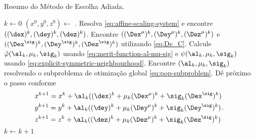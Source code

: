 \begin{algorithm}
\onehalfspacing
\caption{Resumo do Método de Escolha Adiada.}
\label{alg:optimized-choice-of-parameters} \begin{algorithmic}[1]
\State $k \gets 0$
\State $(x^0,y^0,z^0) \gets$ .
	\Repeat
		\State Resolva   \eqref{eq:affine-scaling-system} e encontre
		$((\dex)^{k},(\dey)^{k},(\dez)^{k})$.
		\State 	Encontre $((\Dex^\mu)^{k},(\Dey^\mu)^{k},(\Dez^\mu)^{k})$ e
		$((\Dex^\sig)^{k},(\Dey^\sig)^{k},(\Dez^\sig)^{k})$ utilizando
		\eqref{eq:De_C}.
		\State Calcule  $\hat{\varphi}(\al_{k},\mu_{k},\sig_{k})$ usando
		\eqref{eq:merit-function-al-mu-sig} e $\psi(\al_{k},\mu_{k},\sig_{k})$ usando
		\eqref{eq:explicit-symmetric-neighbourhood}.
		\State Encontre $(\al_{k},\mu_{k},\sig_{k})$ resolvendo o subproblema de
		otimização global 
		\eqref{eq:pop-subproblem}.
		\State Dê próximo o passo conforme
		\[
		\begin{aligned}	
		& x^{k+1} = x^{k} + \al_k((\dex)^{k} + \mu_{k}(\Dex^\mu)^{k} +
		\sig_{k}(\Dex^\sig)^{k} )
		\\
		& y^{k+1} = y^{k} + \al_k((\dey)^{k} + \mu_{k}(\Dey^\mu)^{k} +
		\sig_{k}(\Dey^\sig)^{k} )
		\\
		& z^{k+1} = z^{k} + \al_k((\dez)^{k} + \mu_{k}(\Dez^\mu)^{k} +
		\sig_{k}(\Dez^\sig)^{k} ) \end{aligned}. 
		\]		
		\State $k\gets k+1$
\EndProcedure
\end{algorithmic}
\end{algorithm}
  
 
 
